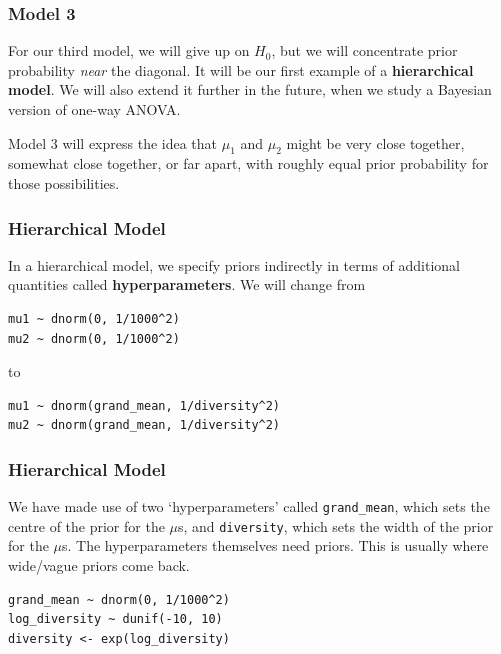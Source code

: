 \documentclass{beamer}
\begin{document}
\begin{frame}
\frametitle{Model 3}
For our third model, we will give up on $H_0$, but we will concentrate
prior probability {\em near} the diagonal. It will be our first example of
a {\bf hierarchical model}. We will also extend it further in the future,
when we study a Bayesian version of one-way ANOVA.\\[0.5em]\pause

Model 3 will express the idea that $\mu_1$ and $\mu_2$ might be very close
together, somewhat close together, or far apart, with roughly equal prior
probability for those possibilities.
\end{frame}


\begin{frame}[fragile]
\frametitle{Hierarchical Model}
In a hierarchical model, we specify priors indirectly in terms of additional
quantities called {\bf hyperparameters}. We will change from
\begin{verbatim}
mu1 ~ dnorm(0, 1/1000^2)
mu2 ~ dnorm(0, 1/1000^2)
\end{verbatim}
\pause
to
\begin{verbatim}
mu1 ~ dnorm(grand_mean, 1/diversity^2)
mu2 ~ dnorm(grand_mean, 1/diversity^2)
\end{verbatim}

\end{frame}

\begin{frame}[fragile]
\frametitle{Hierarchical Model}
We have made use of two `hyperparameters' called \texttt{grand_mean},
which sets the centre of the prior for the $\mu$s, and \texttt{diversity},
which sets the width of the prior for the $\mu$s. The hyperparameters
themselves need priors. This is usually where wide/vague priors come back.\\[0.5em]

\begin{verbatim}
grand_mean ~ dnorm(0, 1/1000^2)
log_diversity ~ dunif(-10, 10)
diversity <- exp(log_diversity)
\end{verbatim}

\end{frame}
\end{document}
